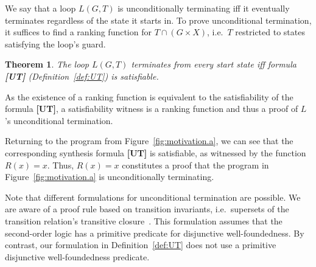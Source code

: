 \documentclass[preprint]{sigplanconf}
\newtheorem{theorem}{Theorem}
\theoremstyle{definition}
\begin{document}
We say that a loop $L(G, T)$ is unconditionally terminating iff it eventually
terminates regardless of the state it starts in. To prove unconditional termination, it suffices
to find a ranking function for \mbox{$T \cap (G \times X)$}, i.e.~$T$ restricted to states satisfying the loop's guard.


\begin{theorem}
\label{thm:ut}
 The loop $L(G, T)$ terminates from every start state iff formula {\bf [UT]} (Definition~\ref{def:UT}) is satisfiable.
\end{theorem}

% 

As the existence of a ranking function is equivalent to the satisfiability
of the formula {\bf [UT]}, a satisfiability witness is a ranking
function and thus a proof of $L$'s unconditional termination.

Returning to the program from Figure~\ref{fig:motivation.a}, we
can see that the corresponding synthesis formula {\bf [UT]} is satisfiable,
as witnessed by the function $R(x) = x$.  Thus, $R(x) = x$ constitutes a
proof that the program in Figure~\ref{fig:motivation.a} is unconditionally
terminating.

Note that different formulations for unconditional termination are possible. 
We are aware of a proof rule based on transition invariants, i.e.~supersets
of the transition relation's transitive
closure~\cite{DBLP:conf/pldi/GrebenshchikovLPR12}.  This formulation assumes
that the second-order logic has a primitive predicate for disjunctive
well-foundedness.  By contrast, our formulation in Definition~\ref{def:UT}
does not use a primitive disjunctive well-foundedness predicate.  \\
\end{document}
